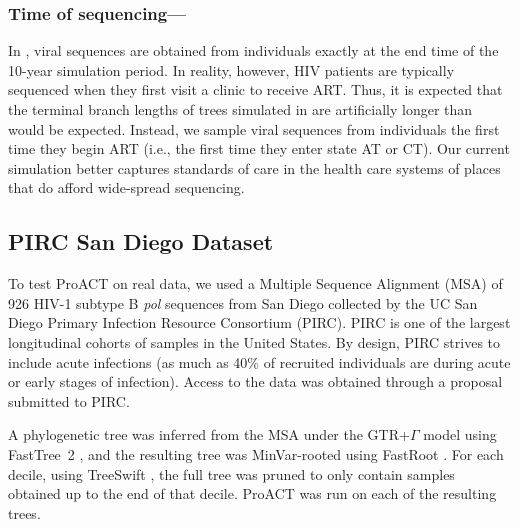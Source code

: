 \documentclass[a4paper,10pt]{article}
\newcommand{\PLWH}{sample\xspace}
\begin{document}
\subsubsection{Time of sequencing---} In \textcite{Moshiri2018},
viral sequences are obtained from individuals exactly at the end time of the 10-year simulation period.
In reality, however,
HIV patients are typically sequenced when they first visit a clinic to receive ART.
Thus, it is expected that the terminal branch lengths of trees simulated in \textcite{Moshiri2018} are artificially longer than would be expected.
Instead,
we sample viral sequences from individuals the first time they begin ART (i.e., the first time they enter state AT or CT).
Our current simulation better captures standards of care in the health care systems of places that do afford wide-spread sequencing. 


\subsection{PIRC San Diego Dataset}
To test ProACT on real data, we used a Multiple Sequence Alignment (MSA) of 926 HIV-1 subtype B \textit{pol} sequences from San Diego collected by the UC San Diego Primary Infection Resource Consortium (PIRC). 
PIRC  is one of the largest longitudinal cohorts of \PLWH{s} in the United States. By design, PIRC strives to include acute infections (as much as 40\% of recruited individuals are during acute or early stages of infection).  
Access to the data was obtained through a proposal submitted to PIRC.

A phylogenetic tree was inferred from the MSA under the GTR+$\Gamma$ model using FastTree~2 \supercite{Price2010}, and the resulting tree was MinVar-rooted using FastRoot \supercite{Mai2017}. For each decile, using TreeSwift \supercite{Moshiri2018b}, the full tree was pruned to only contain samples obtained up to the end of that decile. ProACT was run on each of the resulting trees.
\end{document}
